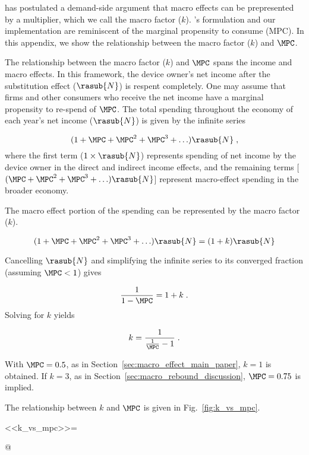 
\citet{Borenstein:2015aa} has postulated a demand-side argument that macro effects 
can be prepresented by a multiplier, which we call the macro factor ($k$).
\citeauthor{Borenstein:2015aa}'s formulation and our implementation 
are reminiscent of the marginal propensity to consume (MPC).
In this appendix, we show the relationship between the macro factor ($k$) and $\MPC$.

The relationship between the macro factor ($k$) and $\MPC$ spans
the income and macro effects.
In this framework, the device owner's net income 
after the substitution effect ($\rasub{N}$) is respent completely.
One may assume that firms and other consumers who receive the net income have a 
marginal propensity to re-spend of $\MPC$.
The total spending throughout the economy of each year's net income ($\rasub{N}$)
is given by the infinite series

\begin{equation} \label{eq:infinite_series_spending}
  (1 + \MPC + \MPC^2 + \MPC^3 + \ldots) \rasub{N} \; ,
\end{equation}
%
where the first term ($1 \times \rasub{N}$) represents spending of net income by the device owner
in the direct and indirect income effects, and
the remaining terms 
[$(\MPC + \MPC^2 + \MPC^3 + \ldots) \rasub{N}$]
represent macro-effect spending in the broader economy.

The macro effect portion of the spending can be represented by the macro factor ($k$).

\begin{equation} \label{eq:mpc_and_k}
  (1 + \MPC + \MPC^2 + \MPC^3 + \ldots) \rasub{N} = (1 + k) \rasub{N}
\end{equation}

Cancelling $\rasub{N}$ and simplifying the infinite series to its converged fraction
(assuming $\MPC < 1$) gives

\begin{equation}
  \frac{1}{1 - \MPC} = 1 + k \; .
\end{equation}
%
Solving for $k$ yields

\begin{equation} \label{eq:mpc_and_k_converged}
  k = \frac{1}{\frac{1}{\MPC} - 1} \; .
\end{equation}

With $\MPC = 0.5$, as in Section~\ref{sec:macro_effect_main_paper}, 
$k = 1$ is obtained.
If $k = 3$, as in Section~\ref{sec:macro_rebound_discussion}, 
$\MPC = 0.75$ is implied.

The relationship between $k$ and $\MPC$ is given in Fig.~\ref{fig:k_vs_mpc}.

<<k_vs_mpc>>=

@

